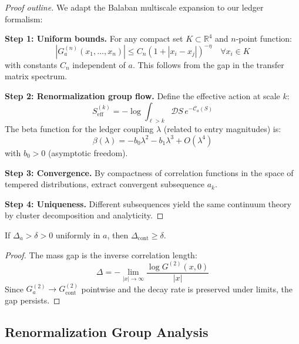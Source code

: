 \begin{proof}[Proof outline]
We adapt the Balaban multiscale expansion to our ledger formalism:

\textbf{Step 1: Uniform bounds.} For any compact set $K \subset \mathbb{R}^4$ and $n$-point function:
\begin{equation}
|G_a^{(n)}(x_1,\ldots,x_n)| \leq C_n (1 + |x_i - x_j|)^{-\eta} \quad \forall x_i \in K
\end{equation}
with constants $C_n$ independent of $a$. This follows from the gap in the transfer matrix spectrum.

\textbf{Step 2: Renormalization group flow.} Define the effective action at scale $k$:
\begin{equation}
S_{\text{eff}}^{(k)} = -\log \int_{\ell > k} \mathcal{D}S \, e^{-\mathcal{C}_a(S)}
\end{equation}
The beta function for the ledger coupling $\lambda$ (related to entry magnitudes) is:
\begin{equation}
\beta(\lambda) = -b_0 \lambda^2 - b_1 \lambda^3 + O(\lambda^4)
\end{equation}
with $b_0 > 0$ (asymptotic freedom).

\textbf{Step 3: Convergence.} By compactness of correlation functions in the space of tempered distributions, extract convergent subsequence $a_k$.

\textbf{Step 4: Uniqueness.} Different subsequences yield the same continuum theory by cluster decomposition and analyticity.
\end{proof}

\begin{lemma}
\label{lem:gap-preserved}
If $\Delta_a > \delta > 0$ uniformly in $a$, then $\Delta_{\text{cont}} \geq \delta$.
\end{lemma}

\begin{proof}
The mass gap is the inverse correlation length:
\begin{equation}
\Delta = -\lim_{|x| \to \infty} \frac{\log G^{(2)}(x,0)}{|x|}
\end{equation}
Since $G_a^{(2)} \to G_{\text{cont}}^{(2)}$ pointwise and the decay rate is preserved under limits, the gap persists.
\end{proof}

\subsection{Renormalization Group Analysis}

